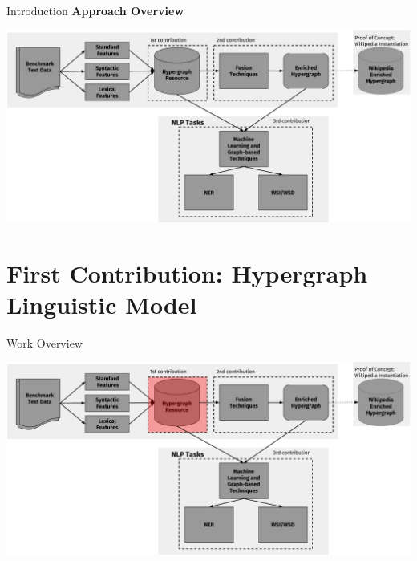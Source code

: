 \documentclass[10pt,xcolor=table]{beamer}
\begin{document}
\begin{frame}{Introduction}
\large  \textbf{Approach Overview} \hfill
\begin{center}
\includegraphics[width=1.04\linewidth]{image2/Chapitre1/main_diag_presi.pdf}
\end{center}

 \vspace{\textheight}
\end{frame}



\section{First Contribution: Hypergraph Linguistic Model}
\begin{frame}{Work Overview}
\begin{center}
\includegraphics[width=1.04\linewidth]{image2/Chapitre3/main_diag_contr1.pdf}
\end{center}

 \vspace{\textheight}
\end{frame} 
\end{document}
